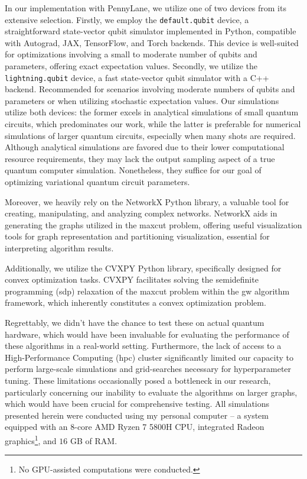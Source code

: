 In our implementation with PennyLane, we utilize one of two devices from its extensive selection. Firstly, we employ the \texttt{default.qubit} device, a straightforward state-vector qubit simulator implemented in Python, compatible with Autograd, JAX, TensorFlow, and Torch backends. This device is well-suited for optimizations involving a small to moderate number of qubits and parameters, offering exact expectation values. Secondly, we utilize the \texttt{lightning.qubit} device, a fast state-vector qubit simulator with a C++ backend. Recommended for scenarios involving moderate numbers of qubits and parameters or when utilizing stochastic expectation values. Our simulations utilize both devices: the former excels in analytical simulations of small quantum circuits, which predominates our work, while the latter is preferable for numerical simulations of larger quantum circuits, especially when many shots are required. Although analytical simulations are favored due to their lower computational resource requirements, they may lack the output sampling aspect of a true quantum computer simulation. Nonetheless, they suffice for our goal of optimizing variational quantum circuit parameters.

Moreover, we heavily rely on the NetworkX \cite{NetworkX} Python library, a valuable tool for creating, manipulating, and analyzing complex networks. NetworkX aids in generating the graphs utilized in the \acrshort{maxcut} problem, offering useful visualization tools for graph representation and partitioning visualization, essential for interpreting algorithm results.

Additionally, we utilize the CVXPY \cite{cvxpy} Python library, specifically designed for convex optimization tasks. CVXPY facilitates solving the semidefinite programming (\acrshort{sdp}) relaxation of the \acrshort{maxcut} problem within the \acrshort{gw} algorithm framework, which inherently constitutes a convex optimization problem.

Regrettably, we didn't have the chance to test these on actual quantum hardware, which would have been invaluable for evaluating the performance of these algorithms in a real-world setting. Furthermore, the lack of access to a High-Performance Computing (\acrshort{hpc}) cluster significantly limited our capacity to perform large-scale simulations and grid-searches necessary for hyperparameter tuning. These limitations occasionally posed a bottleneck in our research, particularly concerning our inability to evaluate the algorithms on larger graphs, which would have been crucial for comprehensive testing. All simulations presented herein were conducted using my personal computer – a system equipped with an 8-core AMD Ryzen 7 5800H CPU, integrated Radeon graphics\footnote{No GPU-assisted computations were conducted.}, and $16$ GB of RAM.


